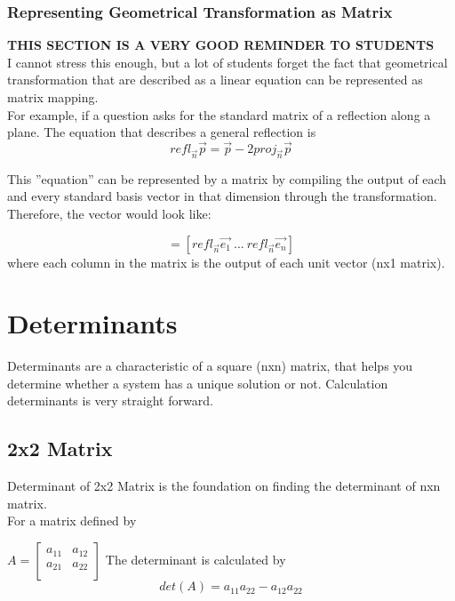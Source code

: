 \documentclass[12pt]{article}
\newcommand{\vectorproj}[2][]{\textit{proj}_{\vec{#1}}\vec{#2}}
\newcommand{\vectorrefl}[2][]{\textit{refl}_{\vec{#1}}\vec{#2}}
\begin{document}
\subsubsection{Representing Geometrical Transformation as Matrix}
\textbf{THIS SECTION IS A VERY GOOD REMINDER TO STUDENTS}\\
I cannot stress this enough, but a lot of students forget the fact that geometrical transformation that are described as a linear equation can be represented as matrix mapping.\\
For example, if a question asks for the standard matrix of a reflection along a plane. The equation that describes a general reflection is 
\begin{equation}
\vectorrefl[n]{p} = \vec{p} - 2\vectorproj[n]{p} 
\end{equation}

This ''equation'' can be represented by a matrix by compiling the output of each and every standard basis vector in that dimension through the transformation. Therefore, the vector would look like:

\begin{equation}
[refl_{\vec{n}}] = [\vectorrefl[n]{e_1}\: ...\: \vectorrefl[n]{e_n} ]
\end{equation}
where each column in the matrix is the output of each unit vector (nx1 matrix).

\section{Determinants}
Determinants are a characteristic of a square (nxn) matrix, that helps you determine whether a system has a unique solution or not. Calculation determinants is very straight forward.
\subsection{2x2 Matrix}
Determinant of 2x2 Matrix is the foundation on finding the determinant of nxn matrix.\\
For a matrix defined by\\
\begin{center}
$
A = \begin{bmatrix}
   a_{11} & a_{12}\\ a_{21} & a_{22}\\ 
 \end{bmatrix}
$ 
The determinant is calculated by\\
\begin{equation}
det(A) = a_{11}a_{22} - a_{12}a_{22}
\end{equation}
\end{center}
\end{document}
